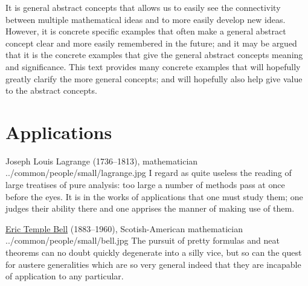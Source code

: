 It is general abstract concepts that allows us to easily see the connectivity
between multiple mathematical ideas and to more easily develop new ideas.
However, it is concrete specific examples that often make a general abstract concept clear
and more easily remembered in the future; and it may be argued that it is the concrete
examples that give the general abstract concepts meaning and significance.
This text provides many concrete examples that will hopefully greatly clarify
the more general concepts;
and will hopefully also help give value to the abstract concepts.

\section*{Applications}

\qboxnpq
  {
    Joseph Louis Lagrange (1736--1813), mathematician
    \footnotemark
  }
  {../common/people/small/lagrange.jpg}
  {I regard as quite useless the reading of large treatises of pure analysis:
    too large a number of methods pass at once before the eyes.
    It is in the works of applications that one must study them;
    one judges their ability there and one apprises the manner of making use of them.}

\qboxnps
  {
    \href{http://en.wikipedia.org/wiki/Eric_temple_bell}{Eric Temple Bell}
    (1883--1960), Scotish-American mathematician
    \footnotemark
  }
  {../common/people/small/bell.jpg}
  {The pursuit of pretty formulas and neat theorems
    can no doubt quickly degenerate into a silly vice,
    but so can the quest for austere generalities which are so very general indeed
    that they are incapable of application to any particular.}



